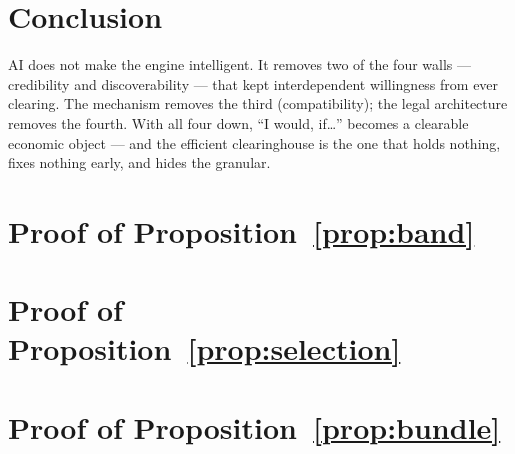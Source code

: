 \documentclass[11pt]{article}
\theoremstyle{definition}
\theoremstyle{remark}
\begin{document}
\section{Conclusion}\label{sec:conclusion}

AI does not make the engine intelligent. It removes two of the four walls --- credibility
and discoverability --- that kept interdependent willingness from ever clearing. The
mechanism removes the third (compatibility); the legal architecture removes the fourth.
With all four down, ``I would, if\ldots'' becomes a clearable economic object --- and the
efficient clearinghouse is the one that holds nothing, fixes nothing early, and hides the
granular.




\clearpage
\appendix

\section{Proof of Proposition~\ref{prop:band}}\label{app:P1}


\clearpage
\section{Proof of Proposition~\ref{prop:selection}}\label{app:P2}


\clearpage
\section{Proof of Proposition~\ref{prop:bundle}}\label{app:P3}

\end{document}
